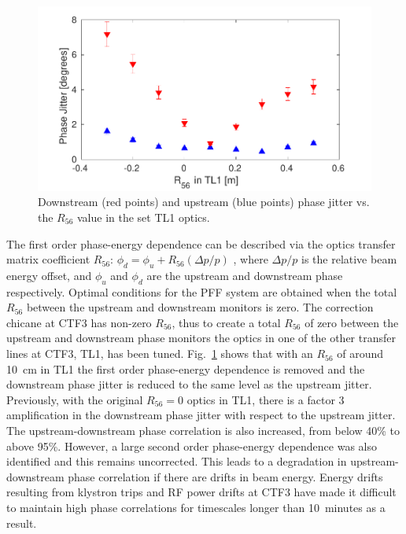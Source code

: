 \documentclass[%
 reprint,
superscriptaddress,
 amsmath,amssymb,
 prl,
]{revtex4-1}
\begin{document}
\begin{figure}
	\includegraphics[width=\columnwidth]{figs/r56Scan}%
	\caption{\label{fig:r56Scan}Downstream (red points) and upstream (blue 
		points) phase jitter vs. the \(R_{56}\) value in the set TL1 optics. 
		}
\end{figure}

The first order phase-energy dependence can be described via the optics 
transfer matrix coefficient \(R_{56}\):
\(\phi_d = \phi_u + R_{56}(\Delta p / p)\)
, where \(\Delta p / p\) is the relative beam energy offset, and \(\phi_u\) and 
\(\phi_d\) are the upstream and downstream phase respectively.
Optimal conditions for the PFF system are obtained when the total \(R_{56}\) 
between the upstream and downstream monitors is zero.
The correction chicane at CTF3 has non-zero \(R_{56}\), thus to create a total 
\(R_{56}\) of zero between the upstream and downstream phase monitors the 
optics in one of the other transfer lines at CTF3, TL1, has been tuned.
Fig.~\ref{fig:r56Scan} shows that with an \(R_{56}\) of around 10~cm in TL1 the 
first order phase-energy dependence is removed and the 
downstream phase jitter is reduced to the same level as the upstream jitter. 
Previously, with the original \(R_{56}=0\) optics in TL1, there is a factor 3 
amplification in the downstream phase jitter with respect to the upstream 
jitter. The upstream-downstream phase correlation is also increased, from below 
40\% to above 95\%. However, a large second order phase-energy dependence was 
also identified and 
this remains uncorrected. This leads to a degradation in upstream-downstream 
phase correlation if there are drifts in beam energy. Energy drifts resulting 
from klystron trips and RF power drifts at CTF3 have made it difficult to 
maintain high phase correlations for timescales longer than 10~minutes as a 
result.
\end{document}
